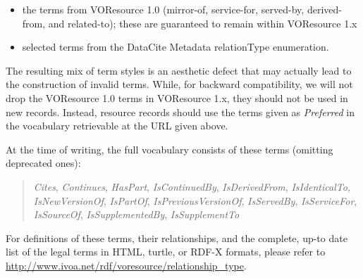 \documentclass[11pt,a4paper]{ivoa}
\begin{document}
\begin{itemize}
\item the terms from VOResource 1.0 (mirror-of, service-for, served-by,
derived-from, and related-to); these are guaranteed to remain within
VOResource 1.x
\item selected terms from the DataCite Metadata relationType enumeration.
\end{itemize}

The resulting mix of term styles is an aesthetic defect that may
actually lead to the construction of invalid terms.  While, for backward
compatibility, we will not drop the VOResource 1.0 terms in
VOResource 1.x, they should not be used in new records.  Instead,
resource records should use the terms given as \emph{Preferred} in the
vocabulary retrievable at the URL given above.

At the time of writing, the full vocabulary consists of these terms
(omitting deprecated ones):

\begin{quotation}\noindent
\raggedright
\textsl{Cites},
\textsl{Continues},
\textsl{HasPart},
\textsl{IsContinuedBy},
\textsl{IsDerivedFrom},
\textsl{IsIdenticalTo},
\textsl{IsNewVersionOf},
\textsl{IsPartOf},
\textsl{IsPreviousVersionOf},
\textsl{IsServedBy},
\textsl{IsServiceFor},
\textsl{IsSourceOf},
\textsl{IsSupplementedBy},
\textsl{IsSupplementTo}
\end{quotation}

For definitions of these terms, their relationships, and the complete,
up-to date list of the legal terms in HTML, turtle, or RDF-X formats,
please refer to \url{http://www.ivoa.net/rdf/voresource/relationship_type}.
\end{document}
